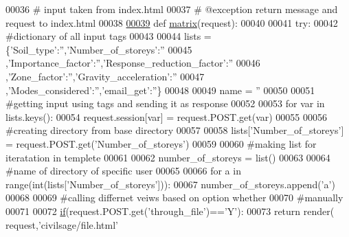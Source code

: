 \begin{DoxyCode}
00036 \textcolor{comment}{# input taken from index.html}
00037 \textcolor{comment}{# @exception return message and request to index.html}
00038 
\hypertarget{views_8py_source_l00039}{}\hyperlink{namespacecivilsage_1_1views_a8b58c93a9c82e84143c43dafaa744a4b}{00039} \textcolor{keyword}{def }\hyperlink{namespacecivilsage_1_1views_a8b58c93a9c82e84143c43dafaa744a4b}{matrix}(request):
00040 
00041     \textcolor{keywordflow}{try}:
00042         \textcolor{comment}{#dictionary of all input tags}
00043         
00044         lists = \{\textcolor{stringliteral}{'Soil\_type'}:\textcolor{stringliteral}{''},\textcolor{stringliteral}{'Number\_of\_storeys'}:\textcolor{stringliteral}{''}
00045         ,\textcolor{stringliteral}{'Importance\_factor'}:\textcolor{stringliteral}{''},\textcolor{stringliteral}{'Response\_reduction\_factor'}:\textcolor{stringliteral}{''}
00046         ,\textcolor{stringliteral}{'Zone\_factor'}:\textcolor{stringliteral}{''},\textcolor{stringliteral}{'Gravity\_acceleration'}:\textcolor{stringliteral}{''}
00047         ,\textcolor{stringliteral}{'Modes\_considered'}:\textcolor{stringliteral}{''},\textcolor{stringliteral}{'email\_get'}:\textcolor{stringliteral}{''}\}
00048 
00049         name = \textcolor{stringliteral}{''}
00050 
00051         \textcolor{comment}{#getting input using tags and sending it as response}
00052         
00053         \textcolor{keywordflow}{for} var \textcolor{keywordflow}{in} lists.keys():
00054             request.session[var] = request.POST.get(var)
00055 
00056         \textcolor{comment}{#creating directory from base directory}
00057         
00058         lists[\textcolor{stringliteral}{'Number\_of\_storeys'}] = request.POST.get(\textcolor{stringliteral}{'Number\_of\_storeys'})
00059 
00060         \textcolor{comment}{#making list for iteratation in templete}
00061         
00062         number\_of\_storeys = list()
00063         
00064         \textcolor{comment}{#name of directory of specific user}
00065         
00066         \textcolor{keywordflow}{for} a \textcolor{keywordflow}{in} range(int(lists[\textcolor{stringliteral}{'Number\_of\_storeys'}])):
00067             number\_of\_storeys.append(\textcolor{stringliteral}{'a'})
00068 
00069         \textcolor{comment}{#calling differnet veiws based on option whether}
00070         \textcolor{comment}{#manually}
00071 
00072         \hyperlink{bootstrap_8min_8js_ac2d69f5011896c6ed4a54e0dd36f6334}{if}(request.POST.get(\textcolor{stringliteral}{'through\_file'})==\textcolor{stringliteral}{'Y'}):
00073             \textcolor{keywordflow}{return} render( request,\textcolor{stringliteral}{'civilsage/file.html'}

\end{DoxyCode}
